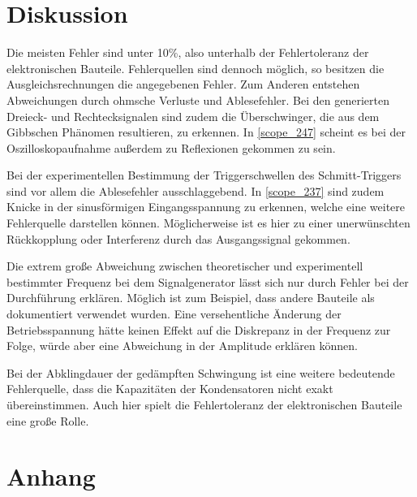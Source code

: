 \section{Diskussion}
Die meisten Fehler sind unter 10\%, also unterhalb der Fehlertoleranz der elektronischen Bauteile. Fehlerquellen sind dennoch möglich, so besitzen die Ausgleichsrechnungen die angegebenen Fehler. Zum Anderen entstehen Abweichungen durch ohmsche Verluste und Ablesefehler. Bei den generierten Dreieck- und Rechtecksignalen sind zudem die Überschwinger, die aus dem Gibbschen Phänomen resultieren, zu erkennen. In \autoref{scope_247} scheint es bei der Oszilloskopaufnahme außerdem zu Reflexionen gekommen zu sein.\par
Bei der experimentellen Bestimmung der Triggerschwellen des Schmitt-Triggers sind vor allem die Ablesefehler ausschlaggebend. In \autoref{scope_237} sind zudem Knicke in der sinusförmigen Eingangsspannung zu erkennen, welche eine weitere Fehlerquelle darstellen können. Möglicherweise ist es hier zu einer unerwünschten Rückkopplung oder Interferenz durch das Ausgangssignal gekommen.\par
Die extrem große Abweichung zwischen theoretischer und experimentell bestimmter Frequenz bei dem Signalgenerator lässt sich nur durch Fehler bei der Durchführung erklären. Möglich ist zum Beispiel, dass andere Bauteile als dokumentiert verwendet wurden. Eine versehentliche Änderung der Betriebsspannung hätte keinen Effekt auf die Diskrepanz in der Frequenz zur Folge, würde aber eine Abweichung in der Amplitude erklären können.\par
Bei der Abklingdauer der gedämpften Schwingung ist eine weitere bedeutende Fehlerquelle, dass die Kapazitäten der Kondensatoren nicht exakt übereinstimmen. Auch hier spielt die Fehlertoleranz der elektronischen Bauteile eine große Rolle.

\printbibliography

\FloatBarrier

\section{Anhang}







